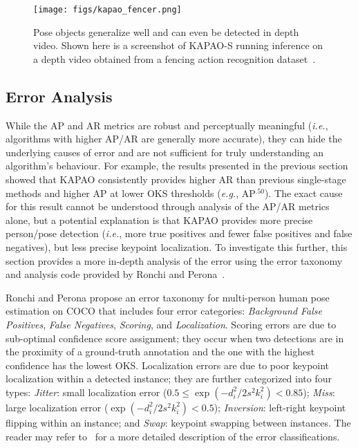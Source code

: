 \documentclass[runningheads]{llncs}
\newcommand{\eg}{\textit{e.g.}}
\newcommand{\ie}{\textit{i.e.}}
\begin{document}
\begin{figure}
\centering
    \texttt{[image: figs/kapao\_fencer.png]}
\caption[KAPAO inference on a depth image.]{Pose objects generalize well and can even be detected in depth video. Shown here is a screenshot of KAPAO-S running inference on a depth video obtained from a fencing action recognition dataset~\cite{app_malawski2016classification, app_zhu2022fencenet}.}
\label{fig:kapao_depth}
\end{figure}

\subsection{Error Analysis}
\label{sec:kapao_error}
While the AP and AR metrics are robust and perceptually meaningful (\ie, algorithms with higher AP/AR are generally more accurate), they can hide the underlying causes of error and are not sufficient for truly understanding an algorithm's behaviour. 
For example, the results presented in the previous section showed that KAPAO consistently provides higher AR than previous single-stage methods and higher AP at lower OKS thresholds (\eg, AP$^{.50}$).
The exact cause for this result cannot be understood through analysis of the AP/AR metrics alone, but a potential explanation is that KAPAO provides more precise person/pose detection (\ie, more true positives and fewer false positives and false negatives), but less precise keypoint localization.
To investigate this further, this section provides a more in-depth analysis of the error using the error taxonomy and analysis code provided by Ronchi and Perona~\cite{app_ronchi2017benchmarking}.

Ronchi and Perona propose an error taxonomy for multi-person human pose estimation on COCO that includes four error categories: \textit{Background False Positives}, \textit{False Negatives}, \textit{Scoring}, and \textit{Localization}. Scoring errors are due to sub-optimal confidence score assignment; they occur when two detections are in the proximity of a ground-truth annotation and the one with the highest confidence has the lowest OKS. Localization errors are due to poor keypoint localization within a detected instance; they are further categorized into four types: \textit{Jitter}: small localization error ($0.5 \leq \exp(-d_i^2/2s^2k_i^2) < 0.85$); \textit{Miss}: large localization error ($\exp(-d_i^2/2s^2k_i^2) < 0.5$); \textit{Inversion}: left-right keypoint flipping within an instance; and \textit{Swap}: keypoint swapping between instances. The reader may refer to~\cite{app_ronchi2017benchmarking} for a more detailed description of the error classifications. 
\end{document}
